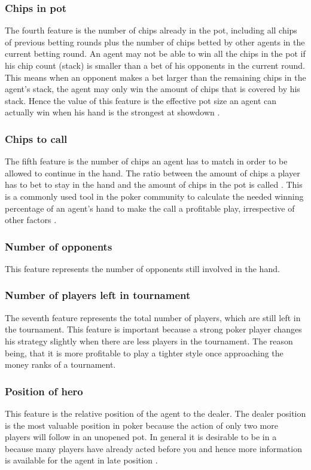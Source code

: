 \subsubsection{Chips in pot}
The fourth feature is the number of chips already in the pot, including all chips of previous betting rounds plus the number of chips betted by other agents in the current betting round. An agent may not be able to win all the chips in the pot if his chip count (stack) is smaller than a bet of his opponents in the current round. This means when an opponent makes a bet larger than the remaining chips in the agent's stack, the agent may only win the amount of chips that is covered by his stack. Hence the value of this feature is the effective pot size an agent can actually win when his hand is the strongest at showdown \cite{evolutionary_methods}.
\subsubsection{Chips to call}
The fifth feature is the number of chips an agent has to match in order to be allowed to continue in the hand. 
The ratio between the amount of chips a player has to bet to stay in the hand and the amount of chips in the pot is called . This is a commonly used tool in the poker community to calculate the needed winning percentage of an agent's hand to make the call a profitable play, irrespective of other factors \cite{evolutionary_methods}.
\subsubsection{Number of opponents}
This feature represents the number of opponents still involved in the hand.
\subsubsection{Number of players left in tournament}
The seventh feature represents the total number of players, which are still left in the tournament. This feature is important because a strong poker player changes his strategy slightly when there are less players in the tournament. The reason being, that it is more profitable to play a tighter style once approaching the money ranks of a tournament.
\subsubsection{Position of hero}
This feature is the relative position of the agent to the dealer. The dealer position is the most valuable position in poker because the action of only two more players will follow in an unopened pot. In general it is desirable to be in a  because many players have already acted before you and hence more information is available for the agent in late position \cite{evolutionary_methods}.
